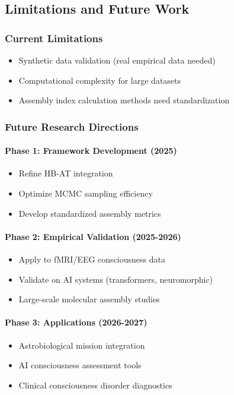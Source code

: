 \documentclass[11pt,a4paper]{article}
\begin{document}
\subsection{Limitations and Future Work}
\label{subsec:limitations}

\subsubsection{Current Limitations}
\begin{itemize}
    \item Synthetic data validation (real empirical data needed)
    \item Computational complexity for large datasets
    \item Assembly index calculation methods need standardization
\end{itemize}

\subsubsection{Future Research Directions}

\paragraph{Phase 1: Framework Development (2025)}
\begin{itemize}
    \item Refine HB-AT integration
    \item Optimize MCMC sampling efficiency
    \item Develop standardized assembly metrics
\end{itemize}

\paragraph{Phase 2: Empirical Validation (2025-2026)}
\begin{itemize}
    \item Apply to fMRI/EEG consciousness data
    \item Validate on AI systems (transformers, neuromorphic)
    \item Large-scale molecular assembly studies
\end{itemize}

\paragraph{Phase 3: Applications (2026-2027)}
\begin{itemize}
    \item Astrobiological mission integration
    \item AI consciousness assessment tools
    \item Clinical consciousness disorder diagnostics
\end{itemize}
\end{document}
